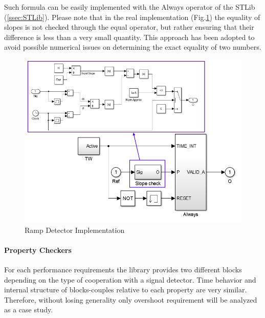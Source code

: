 Such formula can be easily implemented with the Always operator of the STLib (\ref{ssec:STLib}). Please note that in the real implementation (Fig.\ref{fig:rampdetimpl}) the equality of slopes is not checked through the equal operator, but rather ensuring that their difference is less than a very small quantity. This approach has been adopted to avoid possible numerical issues on determining the exact equality of two numbers.
\begin{figure}[ht]
\centering
\includegraphics[width=\textwidth]{Figs/rampimpl.png}
\caption{Ramp Detector Implementation}
\label{fig:rampdetimpl}
\end{figure}
\paragraph{Property Checkers} For each performance requirements the library provides two different blocks depending on the type of cooperation with a signal detector. Time behavior and internal structure of blocks-couples relative to each property are very similar. Therefore, without losing generality only overshoot requirement will be analyzed as a case study.
